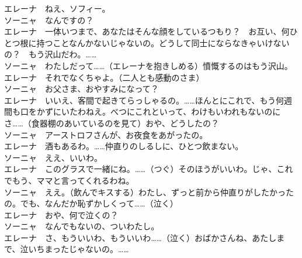 \documentclass[11pt]{jsarticle}
\begin{document}
\begin{multicols}{2}
\columnbreak
\noindent
エレーナ　ねえ、ソフィー。\\
ソーニャ　なんですの？\\
エレーナ　一体いつまで、あなたはそんな顔をしているつもり？　お互い、何ひとつ根に持つことなんかないじゃないの。どうして同士にならなきゃいけないの？　もう沢山だわ。……\\
ソーニャ　わたしだって……（エレーナを抱きしめる）憤慨するのはもう沢山。\\
エレーナ　それでなくちゃよ。（二人とも感動のさま）\\
ソーニャ　お父さま、おやすみになって？\\
エレーナ　いいえ、客間で起きてらっしゃるの。……ほんとにこれで、もう何週間も口をかずにいたわねえ。べつにこれといって、わけもいわれもないのにさ……（食器棚のあいているのを見て）おや、どうしたの？\\
ソーニャ　アーストロフさんが、お夜食をあがったの。\\
エレーナ　酒もあるわ。……仲直りのしるしに、ひとつ飲まない。\\
ソーニャ　ええ、いいわ。\\
エレーナ　このグラスで一緒にね。……（つぐ）そのほうがいいわ。じゃ、これでもう、ママと言ってくれるわね。\\
ソーニャ　ええ。（飲んでキスする）わたし、ずっと前から仲直りがしたかったの。でも、なんだか恥ずかしくって……（泣く）\\
エレーナ　おや、何で泣くの？\\
ソーニャ　なんでもないの、ついわたし。\\
エレーナ　さ、もういいわ、もういいわ……（泣く）おばかさんね、あたしまで、泣いちまったじゃないの。……
\end{multicols}
\end{document}
